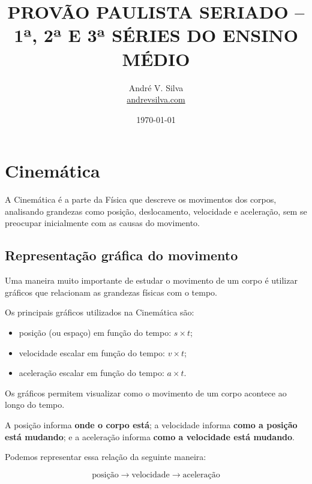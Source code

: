 \documentclass[a4paper,12pt]{article}
\title{
    \textbf{\large
    PROVÃO PAULISTA SERIADO -- 1ª, 2ª E 3ª SÉRIES DO ENSINO MÉDIO}
}
\author{
    André V. Silva \\
    \href{https://andrevsilva.com/}{andrevsilva.com}
}
\date{\today}
\begin{document}
\maketitle


\tableofcontents

\section{Cinemática}

A Cinemática é a parte da Física que descreve os movimentos dos corpos,
analisando grandezas como posição, deslocamento, velocidade e aceleração,
sem se preocupar inicialmente com as causas do movimento.

\subsection{Representação gráfica do movimento}

Uma maneira muito importante de estudar o movimento de um corpo é utilizar
gráficos que relacionam as grandezas físicas com o tempo.

Os principais gráficos utilizados na Cinemática são:

\begin{itemize}
    \item posição (ou espaço) em função do tempo: $s \times t$;
    \item velocidade escalar em função do tempo: $v \times t$;
    \item aceleração escalar em função do tempo: $a \times t$.
\end{itemize}

\begin{ideia}

Os gráficos permitem visualizar como o movimento de um corpo acontece ao
longo do tempo.

A posição informa \textbf{onde o corpo está}; a velocidade informa
\textbf{como a posição está mudando}; e a aceleração informa
\textbf{como a velocidade está mudando}.

Podemos representar essa relação da seguinte maneira:

\[
\boxed{
\text{posição}
\longrightarrow
\text{velocidade}
\longrightarrow
\text{aceleração}
}
\]

\end{ideia}
\end{document}
